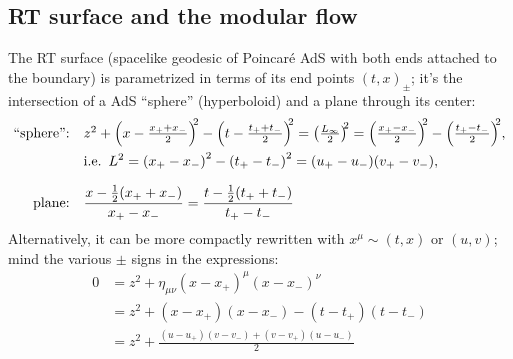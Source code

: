 \documentclass[11pt,a4paper]{article}
\begin{document}
\subsection{RT surface and the modular flow}


	The RT surface (spacelike geodesic of Poincar\'e AdS with both ends attached to the boundary) is parametrized in terms of its end points $(t,x)_\pm$; it's the intersection of a AdS ``sphere'' (hyperboloid) and a plane through its center:
	\begin{equation}
	\begin{aligned}
	\text{``sphere'':} &&&\mathsmaller{
		z^2
		+ \pqty{x - \frac{x_+ + x_-}{2}}^{\!\!2}
		- \pqty{t - \frac{t_+ + t_-}{2}}^{\!\!2}
		= \pqty{\frac{L_\infty}{2}}^{\!\!2}
		= \pqty{\frac{x_+ - x_-}{2}}^{\!\!2}
		- \pqty{\frac{t_+ - t_-}{2}}^{\!\!2}
	},\\
	&&& \text{i.e.}\ \,
		L^2
		= \pqty{x_+ - x_-}^2
			- \pqty{t_+ - t_-}^2
		= (u_+ - u_-)(v_+ - v_-),
	\\[1.5ex]
	\text{plane:} &&&
		\frac{x - \frac{1}{2} (x_+ + x_-)}{x_+ - x_-}
		= \frac{t - \frac{1}{2} (t_+ + t_-)}{t_+ - t_-}
	\end{aligned}
	\end{equation}
	Alternatively, it can be more compactly rewritten with $x^\mu \sim (t,x)$ or $(u,v)$; mind the various $\pm$ signs in the expressions: 
	\begin{equation}
	\begin{aligned}
		0 &= z^2
			+ \eta_{\mu\nu} (x - x_+)^\mu (x - x_-)^\nu \\
		& = z^2
			+ (x - x_+)(x - x_-)
			- (t - t_+)(t - t_-) \\
		&= z^2 + \frac{
				(u - u_+)(v - v_-)
				+ (v - v_+)(u - u_-)
			}{2}
	\end{aligned}
	\end{equation}
	
\end{document}
